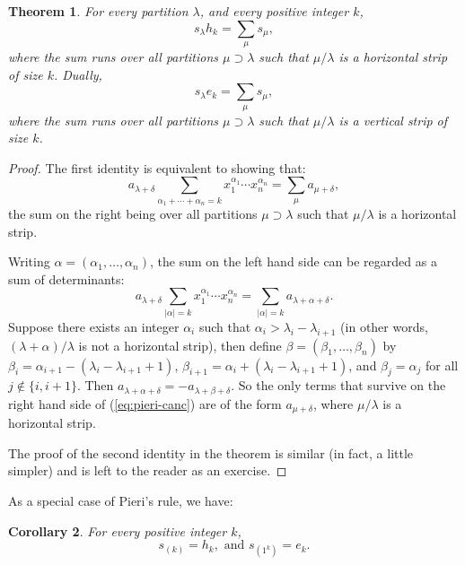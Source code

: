 \documentclass[11pt]{amsart}
\newtheorem{theorem}{Theorem}[subsection]
\newtheorem{corollary}[theorem]{Corollary}
\theoremstyle{definition}
\theoremstyle{example}
\begin{document}
\begin{theorem}
  For every partition $\lambda$, and every positive integer $k$,
  \begin{displaymath}
    s_\lambda h_k = \sum_\mu s_\mu,
  \end{displaymath}
  where the sum runs over all partitions $\mu\supset\lambda$ such that $\mu/\lambda$ is a horizontal strip of size $k$.
  Dually,
  \begin{displaymath}
    s_\lambda e_k = \sum_\mu s_\mu,
  \end{displaymath}
  where the sum runs over all partitions $\mu\supset\lambda$ such that $\mu/\lambda$ is a vertical strip of size $k$.
\end{theorem}
\begin{proof}
  The first identity is equivalent to showing that:
  \begin{displaymath}
    a_{\lambda+\delta} \sum_{\alpha_1+\dotsb+\alpha_n=k} x_1^{\alpha_1}\dotsb x_n^{\alpha_n} = \sum_\mu a_{\mu+\delta},
  \end{displaymath}
  the sum on the right being over all partitions $\mu\supset\lambda$ such that $\mu/\lambda$ is a horizontal strip.

  Writing $\alpha=(\alpha_1,\dotsc,\alpha_n)$, the sum on the left hand side can be regarded as a sum of determinants:
  \begin{equation}
    \label{eq:pieri-canc}
    a_{\lambda+\delta} \sum_{|\alpha|=k} x_1^{\alpha_1}\dotsb x_n^{\alpha_n} = \sum_{|\alpha|=k} a_{\lambda + \alpha + \delta}.
  \end{equation}
  Suppose there exists an integer $\alpha_i$ such that $\alpha_i>\lambda_i-\lambda_{i+1}$ (in other words, $(\lambda + \alpha)/\lambda$ is not a horizontal strip), then define $\beta=(\beta_1,\dotsc,\beta_n)$ by $\beta_i = \alpha_{i+1} - (\lambda_i - \lambda_{i+1} + 1)$, $\beta_{i+1} = \alpha_i + (\lambda_i - \lambda_{i+1} +1)$, and $\beta_j=\alpha_j$ for all $j\notin \{i, i+1\}$.
  Then $a_{\lambda+\alpha+\delta} = -a_{\lambda+\beta+\delta}$.
  So the only terms that survive on the right hand side of (\ref{eq:pieri-canc}) are of the form $a_{\mu+\delta}$, where $\mu/\lambda$ is a horizontal strip.

  The proof of the second identity in the theorem is similar (in fact, a little simpler) and is left to the reader as an exercise.
\end{proof}
As a special case of Pieri's rule, we have:
\begin{corollary}
  For every positive integer $k$,
  \begin{displaymath}
    s_{(k)} = h_k, \text{ and } s_{(1^k)} = e_k.
  \end{displaymath}
\end{corollary}
\end{document}
